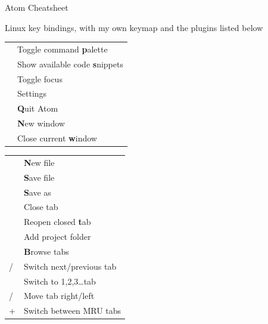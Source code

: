 \documentclass[a4paper]{article}
\newenvironment{keytable}[1]{%
  \begin{tabular}{|>{\rule{0pt}{0.85\normalbaselineskip}}l|l|}
  \hline
  \rowcolor[gray]{.8}
  \multicolumn{2}{|l|}{\bfseries #1}\\ \hline
}{%
  \end{tabular}\par\vspace{5mm}%
}
\begin{document}
\begin{center}

{\huge Atom Cheatsheet}

{\small Linux key bindings, with my own keymap and the plugins listed below}

\vspace{5mm}
\small

\begin{multicols*}{2}
\begin{keytable}{General}
\keys{Ctrl + Shift + \textbf{p}}                           & Toggle command \textbf{p}alette \\ \hline
\keys{Alt + Shift + \textbf{s}}                            & Show available code \textbf{s}nippets \\ \hline
\keys{Alt + \textbackslash}                                & Toggle focus\\ \hline
\keys{Ctrl + ,}                                            & Settings \\ \hline %

\keys{Ctrl + \textbf{q}}                                   & \textbf{Q}uit Atom \\ \hline

\keys{Ctrl + Shift + \textbf{n}}                           & \textbf{N}ew window \\ \hline
\keys{Ctrl + Shift + \textbf{w}}                           & Close current \textbf{w}indow\\ \hline
\end{keytable}

\begin{keytable}{File Management}
\keys{Ctrl + \textbf{n}}                                   & \textbf{N}ew file \\ \hline
\keys{Ctrl + \textbf{s}}                                   & \textbf{S}ave file \\ \hline
\keys{Ctrl + Shift + \textbf{s}}                           & \textbf{S}ave as \\ \hline
\keys{Ctrl + w}                                            & Close tab \\ \hline
\keys{Ctrl + Shift + t}                                    & Reopen closed \textbf{t}ab \\ \hline
\keys{Alt + Shift + o}                                     & Add project folder \\ \hline

\keys{Ctrl + Shift + \textbf{b}}                           & \textbf{B}rowse tabs \\ \hline
\keys{Ctrl + PgDown} / \keys{PgUp}                         & Switch next/previous tab \\ \hline
\keys{Alt + 1,2,3\dots}                                    & Switch to 1,2,3\dots tab \\ \hline
\keys{Ctrl + Shift + PgDown} / \keys{PgUp}                 & Move tab right/left \\ \hline
\keys{Ctrl + Shift} + \keys{Tab}                           & Switch between MRU tabs \\ \hline
\end{keytable}


\end{multicols*}
\end{center}
\end{document}
